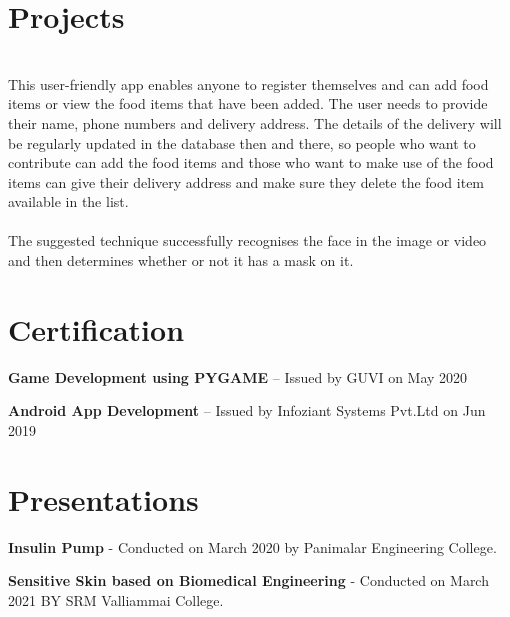 \documentclass[]{deedy-resume-openfont}
\begin{document}
\begin{minipage}[t]{0.66\textwidth}
\section{Projects}
\vspace{\topsep}
 \\
\vspace{\topsep}
This user-friendly app enables anyone to register themselves and can add food items or view the food items that have been added. The user needs to provide their name, phone numbers and delivery address. The details of the delivery will be regularly updated in the database then and there, so people who want to contribute can add the food items and those who want to make use of the food items can give their delivery address and make sure they delete the food item available in the list.  \\
\vspace{\topsep}
 \\
\vspace{\topsep}
The suggested technique successfully recognises the face in the image or video and then determines whether or not it has a mask on it. 
\sectionsep


\section{Certification} 
\vspace{\topsep}
\begin{tightemize}
\item \textbf{Game Development using PYGAME} – Issued by GUVI on May 2020
\item \textbf{Android App Development} – Issued by Infoziant Systems Pvt.Ltd on Jun 2019
\end{tightemize}

\section{Presentations} 
\vspace{\topsep}
\begin{tightemize}
\item \textbf{Insulin Pump} - Conducted on March 2020 by Panimalar Engineering College.
\vspace{\topsep}
\item \textbf{Sensitive Skin based on Biomedical Engineering} - Conducted on March 2021 BY SRM Valliammai College.
\end{tightemize}
\end{minipage} 
\end{document}
